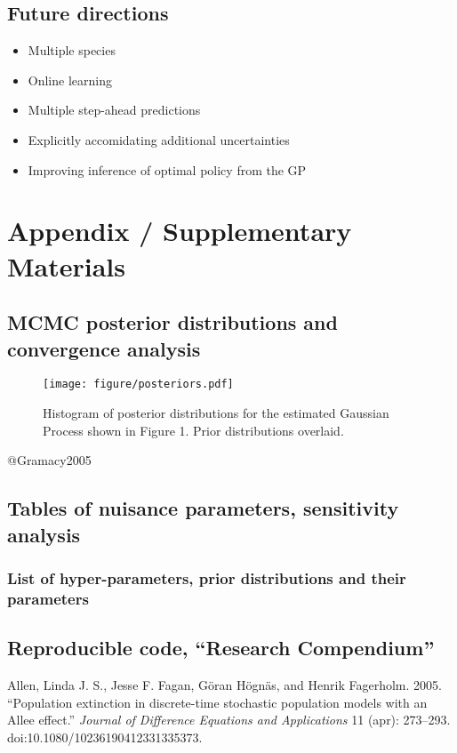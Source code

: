 \documentclass[author-year, review]{elsarticle} %
\begin{document}
\subsection{Future directions}

\begin{itemize}
\item
  Multiple species
\item
  Online learning
\item
  Multiple step-ahead predictions
\item
  Explicitly accomidating additional uncertainties
\item
  Improving inference of optimal policy from the GP
\end{itemize}

\section{Appendix / Supplementary Materials}

\subsection{MCMC posterior distributions and convergence analysis}

\begin{figure}[htbp]
\centering
\texttt{[image: figure/posteriors.pdf]}
\caption{Histogram of posterior distributions for the estimated Gaussian
Process shown in Figure 1. Prior distributions overlaid.}
\end{figure}

@Gramacy2005

\subsection{Tables of nuisance parameters, sensitivity analysis}

\subsubsection{List of hyper-parameters, prior distributions and their
parameters}

\subsection{Reproducible code, ``Research Compendium''}

Allen, Linda J. S., Jesse F. Fagan, Göran Högnäs, and Henrik Fagerholm.
2005. ``Population extinction in discrete-time stochastic population
models with an Allee effect.'' \emph{Journal of Difference Equations and
Applications} 11 (apr): 273--293. doi:10.1080/10236190412331335373.
\end{document}
